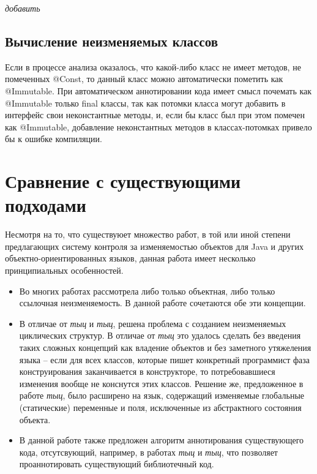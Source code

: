 \textit{добавить}

\subsection{Вычисление неизменяемых классов}

Если в процессе анализа оказалось, что какой-либо класс не имеет методов, не помеченных @Const, то данный класс можно автоматически пометить как @Immutable. При автоматическом аннотировании кода имеет смысл почемать как @Immutable только final классы, так как потомки класса могут добавить в интерфейс свои неконстантные методы, и, если бы класс был при этом помечен как @Immutable, добавление неконстантных методов в классах-потомках привело бы к ошибке компиляции.

\section{Сравнение с существующими подходами}

Несмотря на то, что существуюет множество работ, в той или иной степени предлагающих систему контроля за изменяемостью объектов для Java и других объектно-ориентированных языков, данная работа имеет несколько принципиальных особенностей. 

\begin{itemize}
	\item Во многих работах рассмотрела либо только объектная, либо только ссылочная неизменяемость. В данной работе сочетаются обе эти концепции.
	\item В отличае от \textit{тыц} и \textit{тыц}, решена проблема с созданием неизменяемых циклических структур. В отличае от \textit{тыц} это удалось сделать без введения таких сложных концепций как владение объектов и без заметного утяжеления языка -- если для всех классов, которые пишет конкретный программист фаза конструирования заканчивается в конструкторе, то потребовавшиеся изменения вообще не конснутся этих классов. Решение же, предложенное в работе \textit{тыц}, было расширено на язык, содержащий изменяемые глобальные (статические) переменные и поля, исключенные из абстрактного состояния объекта.
	\item В данной работе также предложен алгоритм аннотирования существующего кода, отсутсвующий, например, в работах \textit{тыц} и \textit{тыц}, что позволяет проаннотировать существующий библиотечный код.  
\end{itemize}


























